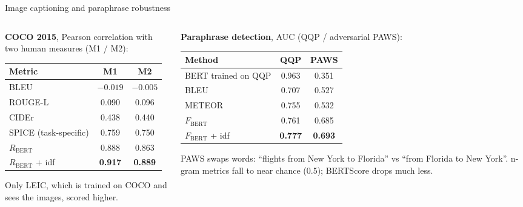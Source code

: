 \documentclass[aspectratio=169,11pt]{beamer}
\begin{document}
\begin{frame}{Image captioning and paraphrase robustness}
  \begin{columns}[T]
    \begin{column}{0.48\textwidth}
      \footnotesize
      \textbf{COCO 2015}, Pearson correlation with two human measures (M1 / M2):
      \vspace{1mm}

      \begin{tabular}{@{}lcc@{}}
        \toprule
        Metric & M1 & M2\\
        \midrule
        BLEU & $-0.019$ & $-0.005$\\
        ROUGE-L & 0.090 & 0.096\\
        CIDEr & 0.438 & 0.440\\
        SPICE (task-specific) & 0.759 & 0.750\\
        $R_{\text{BERT}}$ & 0.888 & 0.863\\
        $R_{\text{BERT}}$ + idf & \textbf{0.917} & \textbf{0.889}\\
        \bottomrule
      \end{tabular}
      \vspace{1mm}

      Only LEIC, which is trained on COCO and sees the images, scored higher.
    \end{column}
    \begin{column}{0.48\textwidth}
      \footnotesize
      \textbf{Paraphrase detection}, AUC (QQP / adversarial PAWS):
      \vspace{1mm}

      \begin{tabular}{@{}lcc@{}}
        \toprule
        Method & QQP & PAWS\\
        \midrule
        BERT trained on QQP & 0.963 & 0.351\\
        BLEU & 0.707 & 0.527\\
        METEOR & 0.755 & 0.532\\
        $F_{\text{BERT}}$ & 0.761 & 0.685\\
        $F_{\text{BERT}}$ + idf & \textbf{0.777} & \textbf{0.693}\\
        \bottomrule
      \end{tabular}
      \vspace{1mm}

      PAWS swaps words: ``flights from New York to Florida'' vs ``from Florida to New York''. n-gram metrics fall to near chance (0.5); BERTScore drops much less.
    \end{column}
  \end{columns}
\end{frame}
\end{document}
